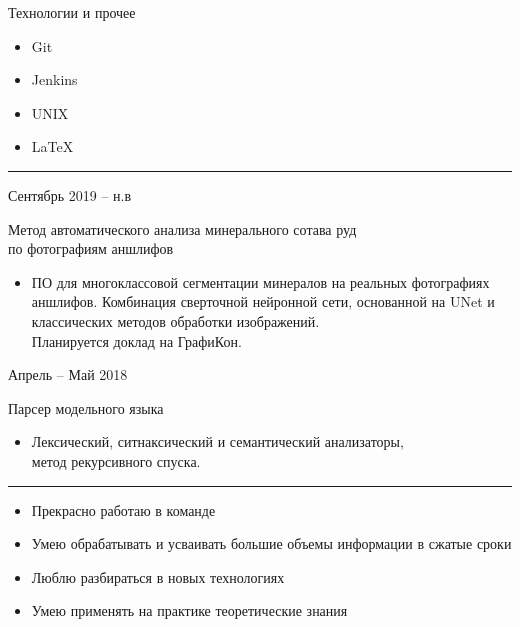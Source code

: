 \documentclass[a4paper,10pt]{article}
\newlength{\cvcolumngapwidth}
\newlength{\cvleftcolumnwidth}
\newlength{\cvrightcolumnwidth}
\newcommand{\cvsectionstyle}[1]{{\normalsize\cvsectionfont\textcolor{cvsectioncolor}{#1}}}
\newcommand{\cvtitlestyle}[1]{{\large\cvtitlefont\textcolor{cvtitlecolor}{#1}}}
\newcommand{\cvdurationstyle}[1]{{\small\cvdurationfont\textcolor{cvdurationcolor}{#1}}}
\newcommand{\cvheadingstyle}[1]{{\normalsize\cvheadingfont\textcolor{cvheadingcolor}{#1}}}
\newlength{\cvafteritemskipamount}
\newlength{\cvaftersectionskipamount}
\newlength{\cvbetweensectionandheadingextraskipamount}
\newlength{\cvaftertitleskipamount}
\newlength{\cvparskip}
\newcommand{\cvsection}[1]{
    \begin{minipage}[t]{\cvleftcolumnwidth}
        \raggedleft\cvsectionstyle{#1}
    \end{minipage}%
    \hspace{\cvcolumngapwidth}%
    \begin{minipage}[t]{\cvrightcolumnwidth}
        \textcolor{cvrulecolor}{\rule{\cvrightcolumnwidth}{0.3mm}}
    \end{minipage}

    \vspace{\cvaftersectionskipamount}
}
\newcommand{\cvitem}[2]{
    \begin{minipage}[t]{\cvleftcolumnwidth}
        \raggedleft #1
    \end{minipage}%
    \hspace{\cvcolumngapwidth}%
    \begin{minipage}[t]{\cvrightcolumnwidth}
        \setlength{\parskip}{\cvparskip} #2
    \end{minipage}

    \vspace{\cvafteritemskipamount}
}
\newcommand{\cvtitle}[1]{
    \cvtitlestyle{#1}

    \vspace{\cvaftertitleskipamount}
    \vspace{-\cvparskip}
}
\begin{document}
\cvitem{
    \cvheadingstyle{Технологии и прочее}
}{
    
    \begin{itemize}
        \item Git
        \item Jenkins
        \item UNIX
        \item \LaTeX
    \end{itemize}
}

\newpage
\cvsection{Проекты}

\vspace{\cvbetweensectionandheadingextraskipamount}

\cvitem{
    \cvdurationstyle{Сентябрь 2019 -- н.в}
}{
    \cvtitle{Метод автоматического анализа минерального сотава руд \\ по фотографиям аншлифов}

    \begin{itemize}[leftmargin=*]
        \item ПО для многоклассовой сегментации минералов на реальных фотографиях \\ аншлифов. Комбинация сверточной нейронной сети, основанной на UNet и \\ классических методов обработки изображений. \\Планируется доклад на ГрафиКон.
        
    \end{itemize}
}

\cvitem{
    \cvdurationstyle{Апрель -- Май 2018}
}{
    \cvtitle{Парсер модельного языка}
    \begin{itemize}[leftmargin=*]
        \item Лексический, ситнаксический и семантический анализаторы,\\ метод рекурсивного спуска.
        
    \end{itemize}
}


\cvsection{Личные навыки}

\vspace{\cvbetweensectionandheadingextraskipamount}

\cvitem{
    \cvheadingstyle{}
}{
    
    \begin{itemize}
        \item Прекрасно работаю в команде
        \item Умею обрабатывать и усваивать большие объемы информации в сжатые сроки
        \item Люблю разбираться в новых технологиях
        \item Умею применять на практике теоретические знания
    \end{itemize}

    
}
\end{document}
